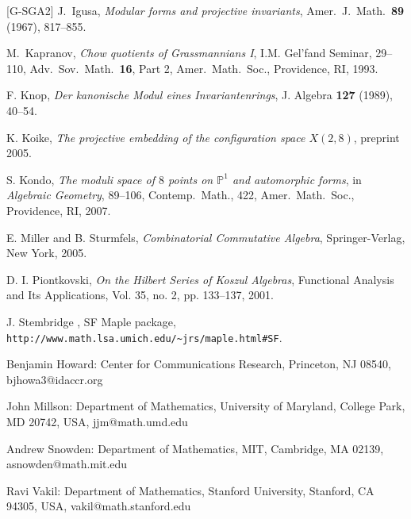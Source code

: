 \documentclass{amsart}
\theoremstyle{definition}
\theoremstyle{remark}
\def\P{\mathbb{P}}
\begin{document}
\begin{thebibliography}{[G-SGA2]}
 J.\ Igusa, {\em Modular forms and projective
invariants}, Amer.\ J.\ Math.\ {\bf 89} (1967), 817--855.

  M.\ Kapranov, {\em Chow quotients of
 Grassmannians I}, I.M. Gel'fand Seminar, 29--110, Adv.\ Sov.\ Math.\ {\bf 16}, Part 2,
Amer.\ Math.\ Soc., Providence, RI, 1993.


 F. Knop, {\em Der kanonische Modul eines
    Invariantenrings}, J. Algebra {\bf 127} (1989), 40--54.

 K. Koike, {\em The projective embedding of the configuration space $X(2,8)$}, preprint 2005.

  S. Kondo, {\em The moduli space of $8$ points
 on $\P^1$ and automorphic forms}, in {\em Algebraic Geometry}, 89--106, Contemp.\ Math.,
 422, Amer.\ Math.\ Soc., Providence, RI, 2007.



 E. Miller and B. Sturmfels, {\em Combinatorial Commutative
  Algebra}, Springer-Verlag, New York, 2005.


D. I. Piontkovski,
{\em On the Hilbert Series of Koszul Algebras},
Functional Analysis and Its Applications, Vol. 35, no. 2, pp. 133–137,
2001.

 J. Stembridge , SF Maple package, \verb+http://www.math.lsa.umich.edu/~jrs/maple.html#SF+.

\end{thebibliography}

\bigskip

{\tiny

Benjamin Howard:
Center for Communications Research,
Princeton, NJ 08540, bjhowa3@idaccr.org

\smallskip

John Millson:
Department of Mathematics,
University of Maryland,
College Park, MD 20742, USA,
jjm@math.umd.edu

\smallskip

Andrew Snowden:
Department of Mathematics,
MIT, Cambridge, MA 02139,
asnowden@math.mit.edu

\smallskip

Ravi Vakil:
Department of Mathematics,
Stanford University,
Stanford, CA 94305, USA,
vakil@math.stanford.edu

}
\end{document}

